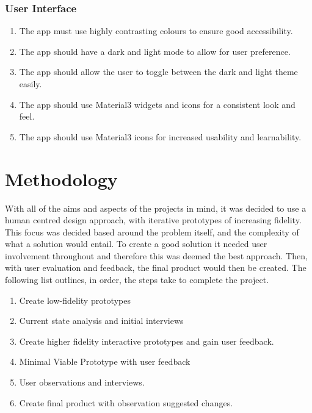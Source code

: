 \documentclass [11pt,a4paper]{article}
\begin{document}
\subsubsection{User Interface}
\label{sec:spec_ui}
\begin{enumerate}[label={\fbox{INTF\_SPEC\_\arabic*}}, leftmargin=*, labelindent=\parindent]
    \item The app must use highly contrasting colours to ensure good accessibility. \label{spec_ui_1}
    \item The app should have a dark and light mode to allow for user preference. \label{spec_ui_2}
    \item The app should allow the user to toggle between the dark and light theme easily.  \label{spec_ui_3}
    \item The app should use Material3 widgets and icons for a consistent look and feel. \label{spec_ui_4}
    \item The app should use Material3 icons for increased usability and learnability. \label{spec_ui_5}
\end{enumerate}

\section{Methodology}
\label{sec:methodology}

With all of the aims and aspects of the projects in mind, it was decided to use a human centred design approach, with iterative prototypes of increasing fidelity. This focus was decided based around the problem itself, and the complexity of what a solution would entail. To create a good solution it needed user involvement throughout and therefore this was deemed the best approach. Then, with user evaluation and feedback, the final product would then be created. The following list outlines, in order, the steps take to complete the project.

\begin{enumerate}
    \item Create low-fidelity prototypes
    \item Current state analysis and initial interviews
    \item Create higher fidelity interactive prototypes and gain user feedback.
    \item Minimal Viable Prototype with user feedback
    \item User observations and interviews.
    \item Create final product with observation suggested changes.
\end{enumerate}
\end{document}
